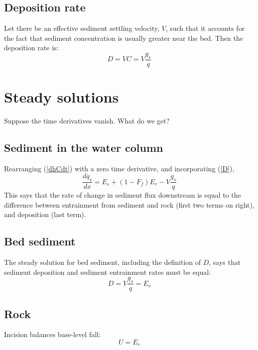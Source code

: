 \documentclass[12pt]{amsart}
\begin{document}
\subsection{Deposition rate}

Let there be an effective sediment settling velocity, $V$, such that it accounts for the fact that sediment concentration is usually greater near the bed. Then the deposition rate is:
\begin{equation}
D = V C = V\frac{q_s}{q}
\label{D}
\end{equation}

\section{Steady solutions}

Suppose the time derivatives vanish. What do we get?

\subsection{Sediment in the water column}

Rearranging (\ref{dhCdt}) with a zero time derivative, and incorporating (\ref{D}),
\begin{equation}
\frac{dq_s}{dx} = E_s + (1-F_f) E_r - V\frac{q_s}{q}
\end{equation}
This says that the rate of change in sediment flux downstream is equal to the difference between entrainment from sediment and rock (first two terms on right), and deposition (last term).

\subsection{Bed sediment}

The steady solution for bed sediment, including the definition of $D$, says that sediment deposition and sediment entrainment rates must be equal:
\begin{equation}
D = V\frac{q_s}{q} = E_s
\end{equation}

\subsection{Rock}

Incision balances base-level fall:
\begin{equation}
U = E_r
\end{equation}
\end{document}
